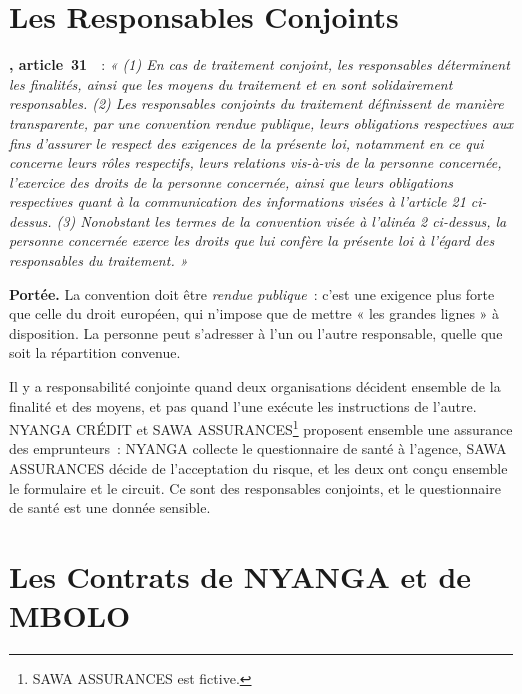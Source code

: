 \section{Les Responsables Conjoints}
\label{sec:c10-conjoints}

\begin{boxjuris}
\textbf{, article~31}~\cite{loi2024017}~:
\textit{« (1) En cas de traitement conjoint, les responsables déterminent
les finalités, ainsi que les moyens du traitement et en sont solidairement
responsables. (2) Les responsables conjoints du traitement définissent de
manière transparente, par une convention rendue publique, leurs
obligations respectives aux fins d'assurer le respect des exigences de la
présente loi, notamment en ce qui concerne leurs rôles respectifs, leurs
relations vis-à-vis de la personne concernée, l'exercice des droits de la
personne concernée, ainsi que leurs obligations respectives quant à la
communication des informations visées à l'article 21 ci-dessus.
(3) Nonobstant les termes de la convention visée à l'alinéa 2 ci-dessus,
la personne concernée exerce les droits que lui confère la présente loi à
l'égard des responsables du traitement. »}

\smallskip
\textbf{Portée.} La convention doit être \textit{rendue publique}~: c'est
une exigence plus forte que celle du droit européen, qui n'impose que de
mettre « les grandes lignes » à disposition. La personne peut s'adresser à
l'un ou l'autre responsable, quelle que soit la répartition convenue.
\end{boxjuris}

Il y a responsabilité conjointe quand deux organisations décident ensemble
de la finalité et des moyens, et pas quand l'une exécute les instructions de
l'autre. NYANGA CRÉDIT et SAWA ASSURANCES\footnote{SAWA ASSURANCES est
fictive.} proposent ensemble une assurance des emprunteurs~: NYANGA
collecte le questionnaire de santé à l'agence, SAWA ASSURANCES décide de
l'acceptation du risque, et les deux ont conçu ensemble le formulaire et
le circuit. Ce sont des responsables conjoints, et le questionnaire de
santé est une donnée sensible.

\section{Les Contrats de NYANGA et de MBOLO}
\label{sec:c10-cas}

